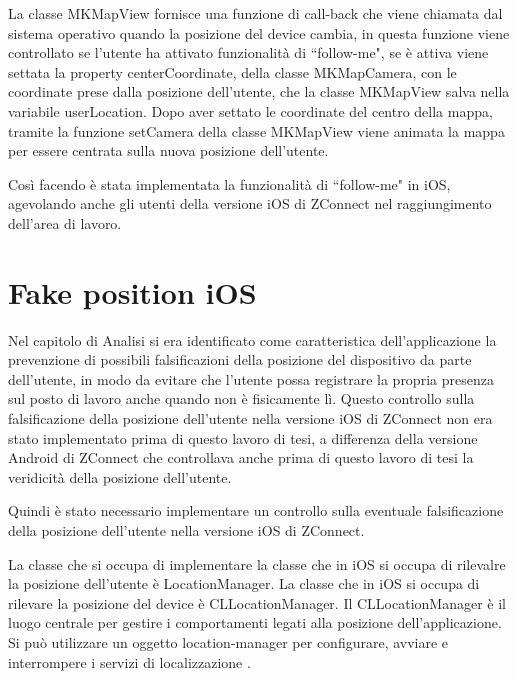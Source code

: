 La classe MKMapView fornisce una funzione di call-back che viene chiamata dal sistema operativo quando la posizione del device cambia, in questa funzione viene controllato se l'utente ha attivato funzionalità di ``follow-me", se è attiva viene settata la property centerCoordinate, della classe MKMapCamera, con le coordinate prese dalla posizione dell'utente, che la classe MKMapView salva nella variabile userLocation. Dopo aver settato le coordinate del centro della mappa, tramite la funzione setCamera della classe MKMapView viene animata la mappa per essere centrata sulla nuova posizione dell'utente.

Così facendo è stata implementata la funzionalità di ``follow-me" in iOS, agevolando anche gli utenti della versione iOS di ZConnect nel raggiungimento dell'area di lavoro.

\section{Fake position iOS}
Nel capitolo di Analisi si era identificato come caratteristica dell'applicazione la prevenzione di possibili falsificazioni della posizione del dispositivo da parte dell'utente, in modo da evitare che l'utente possa registrare la propria presenza sul posto di lavoro anche quando non è fisicamente lì.
Questo controllo sulla falsificazione della posizione dell'utente nella versione iOS di ZConnect non era stato implementato prima di questo lavoro di tesi, a differenza della versione Android di ZConnect che controllava anche prima di questo lavoro di tesi la veridicità della posizione dell'utente.

Quindi è stato necessario implementare un controllo sulla eventuale falsificazione della posizione dell'utente nella versione iOS di ZConnect.

La classe che si occupa di implementare la classe che in iOS si occupa di rilevalre la posizione dell'utente è LocationManager. La classe che in iOS si occupa di rilevare la posizione del device è CLLocationManager. Il CLLocationManager è il luogo centrale per gestire i comportamenti legati alla posizione dell'applicazione. Si può utilizzare un oggetto location-manager per configurare, avviare e interrompere i servizi di localizzazione \cite{CLLocationManager}.

